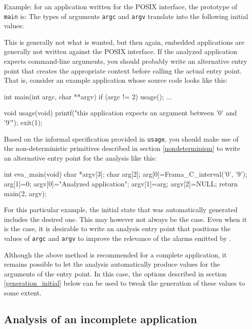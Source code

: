\documentclass{frama-c-book}
\begin{document}
Example: for an application written for the POSIX interface, the
prototype of \lstinline|main| is:
The types of arguments \lstinline|argc| and \lstinline|argv|
translate into the following initial values:

This is generally not what is wanted, but then again, embedded applications
are generally not written against the POSIX interface. If the analyzed
application expects command-line arguments, you should probably
write an alternative entry point that creates the appropriate context
before calling the actual entry point.
That is, consider an example application whose source code looks like this:
\begin{listing-nonumber}
int main(int argc, char **argv)
{
  if (argc != 2) usage();
  ...
}

void usage(void)
{
  printf("this application expects an argument between '0' and '9'\n");
  exit(1);
}
\end{listing-nonumber}

Based on the informal specification provided in \lstinline|usage|,
you should make use of the non-deterministic primitives described in
section \ref{nondeterminism} to write an alternative entry point
for the analysis like this:
\begin{listing-nonumber}
int eva_main(void)
{
  char *argv[3];
  char arg[2];
  arg[0]=Frama_C_interval('0', '9');
  arg[1]=0;
  argv[0]="Analyzed application";
  argv[1]=arg;
  argv[2]=NULL;
  return main(2, argv);
}
\end{listing-nonumber}

For this particular example, the initial state that was
automatically generated includes the desired one. This may however
not always be the case. Even when it is the case, it is desirable
to write an analysis entry point that positions the
values of \lstinline|argc| and \lstinline|argv| to
improve the relevance of the alarms emitted by \Eva{}.

Although the above method is recommended for a complete
application, it remains possible to let the analysis automatically
produce values for the arguments of the entry point. In this
case, the options described in section \ref{generation_initial} below
can be used to tweak the generation of these values to some extent.

\subsection{Analysis of an incomplete application}\label{libentry}
\end{document}
